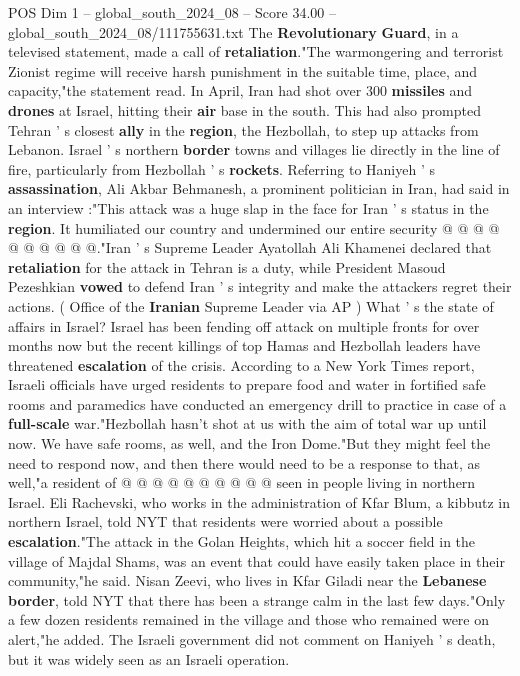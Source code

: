 \begin{textsample}{POS Dim 1 – global\_south\_2024\_08 – Score 34.00 – global\_south\_2024\_08/111755631.txt}
The \textbf{Revolutionary} \textbf{Guard}, in a televised statement, made a call of \textbf{retaliation}."The warmongering and terrorist Zionist regime will receive harsh punishment in the suitable time, place, and capacity,"the statement read.
In April, Iran had shot over 300 \textbf{missiles} and \textbf{drones} at Israel, hitting their \textbf{air} base in the south.
This had also prompted Tehran ' s closest \textbf{ally} in the \textbf{region}, the Hezbollah, to step up attacks from Lebanon.
Israel ' s northern \textbf{border} towns and villages lie directly in the line of fire, particularly from Hezbollah ' s \textbf{rockets}.
Referring to Haniyeh ' s \textbf{assassination}, Ali Akbar Behmanesh, a prominent politician in Iran, had said in an interview :"This attack was a huge slap in the face for Iran ' s status in the \textbf{region}.
It humiliated our country and undermined our entire security @ @ @ @ @ @ @ @ @ @."Iran ' s Supreme Leader Ayatollah Ali Khamenei declared that \textbf{retaliation} for the attack in Tehran is a duty, while President Masoud Pezeshkian \textbf{vowed} to defend Iran ' s integrity and make the attackers regret their actions. ( Office of the \textbf{Iranian} Supreme Leader via AP ) What ' s the state of affairs in Israel?
Israel has been fending off attack on multiple fronts for over months now but the recent killings of top Hamas and Hezbollah leaders have threatened \textbf{escalation} of the crisis.
According to a New York Times report, Israeli officials have urged residents to prepare food and water in fortified safe rooms and paramedics have conducted an emergency drill to practice in case of a \textbf{full-scale} war."Hezbollah hasn't shot at us with the aim of total war up until now.
We have safe rooms, as well, and the Iron Dome."But they might feel the need to respond now, and then there would need to be a response to that, as well,"a resident of @ @ @ @ @ @ @ @ @ @ seen in people living in northern Israel.
Eli Rachevski, who works in the administration of Kfar Blum, a kibbutz in northern Israel, told NYT that residents were worried about a possible \textbf{escalation}."The attack in the Golan Heights, which hit a soccer field in the village of Majdal Shams, was an event that could have easily taken place in their community,"he said.
Nisan Zeevi, who lives in Kfar Giladi near the \textbf{Lebanese} \textbf{border}, told NYT that there has been a strange calm in the last few days."Only a few dozen residents remained in the village and those who remained were on alert,"he added.
The Israeli government did not comment on Haniyeh ' s death, but it was widely seen as an Israeli operation.

\end{textsample}
